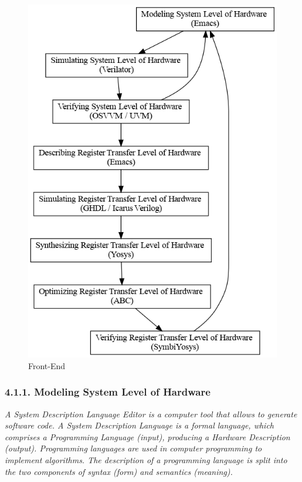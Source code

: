 \documentclass[
]{article}
\begin{document}
\begin{figure}
\centering
\includegraphics{../doc/front-end.png}
\caption{Front-End}
\end{figure}

\hypertarget{modeling-system-level-of-hardware}{%
\subsubsection{4.1.1. Modeling System Level of
Hardware}\label{modeling-system-level-of-hardware}}

\emph{A System Description Language Editor is a computer tool that
allows to generate software code. A System Description Language is a
formal language, which comprises a Programming Language (input),
producing a Hardware Description (output). Programming languages are
used in computer programming to implement algorithms. The description of
a programming language is split into the two components of syntax (form)
and semantics (meaning).}
\end{document}
